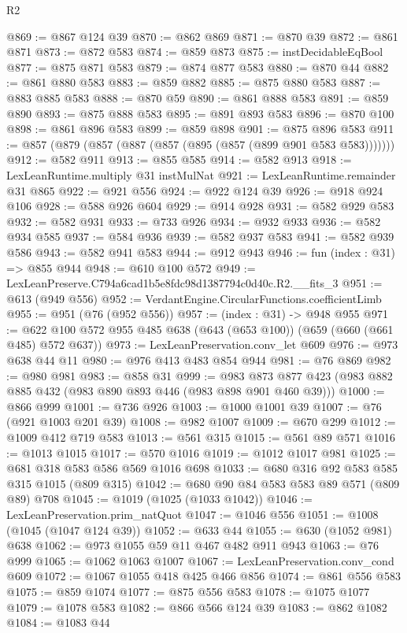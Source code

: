 \begin{lexlean}{R2}
\begin{coremodule}
@869 := @867 @124 @39
@870 := @862 @869
@871 := @870 @39
@872 := @861 @871
@873 := @872 @583
@874 := @859 @873
@875 := instDecidableEqBool
@877 := @875 @871 @583
@879 := @874 @877 @583
@880 := @870 @44
@882 := @861 @880 @583
@883 := @859 @882
@885 := @875 @880 @583
@887 := @883 @885 @583
@888 := @870 @59
@890 := @861 @888 @583
@891 := @859 @890
@893 := @875 @888 @583
@895 := @891 @893 @583
@896 := @870 @100
@898 := @861 @896 @583
@899 := @859 @898
@901 := @875 @896 @583
@911 := @857 (@879 (@857 (@887 (@857 (@895 (@857 (@899 @901 @583 @583)))))))
@912 := @582 @911
@913 := @855 @585
@914 := @582 @913
@918 := LexLeanRuntime.multiply @31 instMulNat
@921 := LexLeanRuntime.remainder @31 @865
@922 := @921 @556
@924 := @922 @124 @39
@926 := @918 @924 @106
@928 := @588 @926 @604
@929 := @914 @928
@931 := @582 @929 @583
@932 := @582 @931
@933 := @733 @926
@934 := @932 @933
@936 := @582 @934 @585
@937 := @584 @936
@939 := @582 @937 @583
@941 := @582 @939 @586
@943 := @582 @941 @583
@944 := @912 @943
@946 := fun (index : @31) => @855 @944
@948 := @610 @100 @572
@949 := LexLeanPreserve.C794a6cad1b5e8fdc98d1387794c0d40c.R2.__fits_3
@951 := @613 (@949 @556)
@952 := VerdantEngine.CircularFunctions.coefficientLimb
@955 := @951 (@76 (@952 @556))
@957 := (index : @31) -> @948 @955
@971 := @622 @100 @572 @955 @485 @638 (@643 (@653 @100)) (@659 (@660 (@661 @485) @572 @637))
@973 := LexLeanPreservation.conv_let @609
@976 := @973 @638 @44 @11
@980 := @976 @413 @483 @854 @944
@981 := @76 @869
@982 := @980 @981
@983 := @858 @31
@999 := @983 @873 @877 @423 (@983 @882 @885 @432 (@983 @890 @893 @446 (@983 @898 @901 @460 @39)))
@1000 := @866 @999
@1001 := @736 @926
@1003 := @1000 @1001 @39
@1007 := @76 (@921 @1003 @201 @39)
@1008 := @982 @1007
@1009 := @670 @299
@1012 := @1009 @412 @719 @583
@1013 := @561 @315
@1015 := @561 @89 @571
@1016 := @1013 @1015
@1017 := @570 @1016
@1019 := @1012 @1017 @981
@1025 := @681 @318 @583 @586 @569 @1016 @698
@1033 := @680 @316 @92 @583 @585 @315 @1015 (@809 @315)
@1042 := @680 @90 @84 @583 @583 @89 @571 (@809 @89) @708
@1045 := @1019 (@1025 (@1033 @1042))
@1046 := LexLeanPreservation.prim_natQuot
@1047 := @1046 @556
@1051 := @1008 (@1045 (@1047 @124 @39))
@1052 := @633 @44
@1055 := @630 (@1052 @981) @638
@1062 := @973 @1055 @59 @11 @467 @482 @911 @943
@1063 := @76 @999
@1065 := @1062 @1063 @1007
@1067 := LexLeanPreservation.conv_cond @609
@1072 := @1067 @1055 @418 @425 @466 @856
@1074 := @861 @556 @583
@1075 := @859 @1074
@1077 := @875 @556 @583
@1078 := @1075 @1077
@1079 := @1078 @583
@1082 := @866 @566 @124 @39
@1083 := @862 @1082
@1084 := @1083 @44

\end{coremodule}
\end{lexlean}
